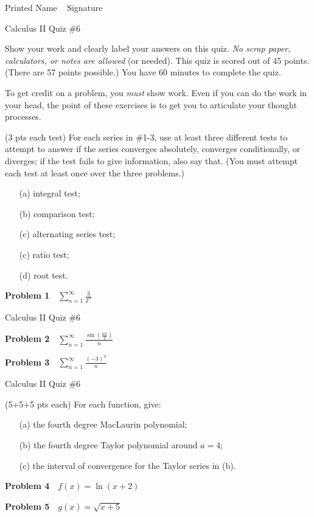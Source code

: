 \documentclass[10pt]{article}
\newcommand{\prob}[1]{\vspace{10mm} \noindent \textbf{Problem #1} \,\,}
\newcommand{\header}{
\begin{center}
Calculus II Quiz \#6
\end{center}

\vspace{2mm}

}
\newcommand{\namefield}{
\noindent Printed Name \underline{\hspace{50mm}} \,\,\, Signature \underline{\hspace{50mm}}
}
\newcommand{\inst}[2]{
Show your work and clearly label your answers on this quiz. \emph{No scrap paper, calculators, or notes are allowed} (or needed). This quiz is scored out of #1 points. (There are #2 points possible.) You have 60 minutes to complete the quiz.

To get credit on a problem, you \emph{must} show work. Even if you can do the work in your head, the point of these exercises is to get you to articulate your thought processes.
}
\begin{document}


\namefield

\header

\inst{45}{57}

\vspace{10mm} 
(3 pts each test) For each series in \#1-3, use at least three different tests to attempt to answer if the series converges absolutely, converges conditionally, or diverges; if the test fails to give information, also say that. (You must attempt each test at least once over the three problems.) 
\begin{itemize}
\item[(a) ] integral test;
\item[(b) ] comparison test;
\item[(c) ] alternating series test; 
\item[(c) ] ratio test; 
\item[(d) ] root test.
\end{itemize}

\prob{1} $\sum\limits_{n = 1}^{\infty} \frac{3}{2^n}$

\pagebreak

\header

\prob{2} $\sum\limits_{n = 1}^{\infty} \frac{\sin(\frac{n\pi}{2})}{n}$

\vspace{70mm}

\prob{3} $\sum\limits_{n = 1}^{\infty} \frac{(-3)^n}{n}$



\pagebreak

\header

(5+5+5 pts each) For each function, give:
\begin{itemize}
\item[(a) ] the fourth degree MacLaurin polynomial;
\item[(b) ] the fourth degree Taylor polynomial around $a = 4$; 
\item[(c) ] the interval of convergence for the Taylor series in (b). 
\end{itemize}

\prob{4} $f(x) = \ln(x + 2)$

\vspace{65mm} 

\prob{5} $g(x) = \sqrt{x + 5}$
\end{document}
